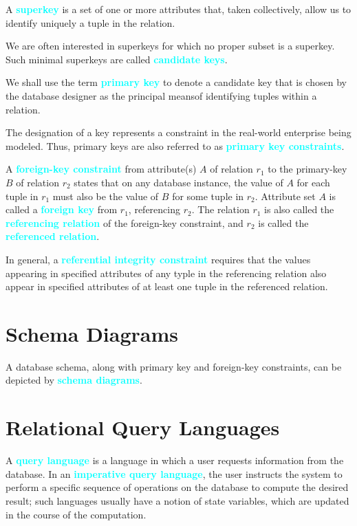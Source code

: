 \documentclass{Beautybook-EN}
\newcommand{\textcy}[1]{\textbf{\textcolor{cyan}{#1}}}
\begin{document}
A \textcy{superkey} is a set of one or more attributes that, taken collectively, allow us to identify uniquely a tuple in the relation.

We are often interested in superkeys for which no proper subset is a superkey. Such minimal superkeys are called \textcy{candidate keys}.

We shall use the term \textcy{primary key} to denote a candidate key that is chosen by the database designer as the principal meansof identifying tuples within a relation.

The designation of a key represents a constraint in the real-world enterprise being modeled. Thus, primary keys are also referred to as \textcy{primary key constraints}.

A \textcy{foreign-key constraint} from attribute(s) $A$ of relation $r_1$ to the primary-key $B$ of relation $r_2$ states that on any database instance, the value of $A$ for each tuple in $r_1$ must also be the value of $B$ for some tuple in $r_2$. Attribute set $A$ is called a \textcy{foreign key} from $r_1$, referencing $r_2$. The relation $r_1$ is also called the \textcy{referencing relation} of the foreign-key constraint, and $r_2$ is called the \textcy{referenced relation}.

In general, a \textcy{referential integrity constraint} requires that the values appearing in specified attributes of any typle in the referencing relation also appear in specified attributes of at least one tuple in the referenced relation.

\section{Schema Diagrams}

A database schema, along with primary key and foreign-key constraints, can be depicted by \textcy{schema diagrams}.

\section{Relational Query Languages}

A \textcy{query language} is a language in which a user requests information from the database. In an \textcy{imperative query language}, the user instructs the system to perform a specific sequence of operations on the database to compute the desired result; such languages usually have a notion of state variables, which are updated in the course of the computation.
\end{document}
